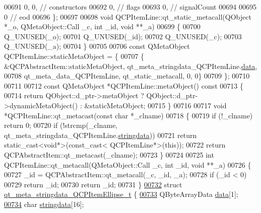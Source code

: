 \begin{DoxyCode}
00691        0,    0, \textcolor{comment}{// constructors}
00692        0,       \textcolor{comment}{// flags}
00693        0,       \textcolor{comment}{// signalCount}
00694 
00695        0        \textcolor{comment}{// eod}
00696 \};
00697 
00698 \textcolor{keywordtype}{void} QCPItemLine::qt\_static\_metacall(QObject *\_o, QMetaObject::Call \_c, \textcolor{keywordtype}{int} \_id, \textcolor{keywordtype}{void} **\_a)
00699 \{
00700     Q\_UNUSED(\_o);
00701     Q\_UNUSED(\_id);
00702     Q\_UNUSED(\_c);
00703     Q\_UNUSED(\_a);
00704 \}
00705 
00706 \textcolor{keyword}{const} QMetaObject QCPItemLine::staticMetaObject = \{
00707     \{ &QCPAbstractItem::staticMetaObject, qt\_meta\_stringdata\_QCPItemLine.\hyperlink{a00016_a02b269c84618a73b8cefdb4c4ae888c6}{data},
00708       qt\_meta\_data\_QCPItemLine,  qt\_static\_metacall, 0, 0\}
00709 \};
00710 
00711 
00712 \textcolor{keyword}{const} QMetaObject *QCPItemLine::metaObject()\textcolor{keyword}{ const}
00713 \textcolor{keyword}{}\{
00714     \textcolor{keywordflow}{return} QObject::d\_ptr->metaObject ? QObject::d\_ptr->dynamicMetaObject() : &staticMetaObject;
00715 \}
00716 
00717 \textcolor{keywordtype}{void} *QCPItemLine::qt\_metacast(\textcolor{keyword}{const} \textcolor{keywordtype}{char} *\_clname)
00718 \{
00719     \textcolor{keywordflow}{if} (!\_clname) \textcolor{keywordflow}{return} 0;
00720     \textcolor{keywordflow}{if} (!strcmp(\_clname, qt\_meta\_stringdata\_QCPItemLine.\hyperlink{a00016_ac705c65b9062c112f8ff0dd2a2915160}{stringdata}))
00721         \textcolor{keywordflow}{return} \textcolor{keyword}{static\_cast<}\textcolor{keywordtype}{void}*\textcolor{keyword}{>}(\textcolor{keyword}{const\_cast<} QCPItemLine*\textcolor{keyword}{>}(\textcolor{keyword}{this}));
00722     \textcolor{keywordflow}{return} QCPAbstractItem::qt\_metacast(\_clname);
00723 \}
00724 
00725 \textcolor{keywordtype}{int} QCPItemLine::qt\_metacall(QMetaObject::Call \_c, \textcolor{keywordtype}{int} \_id, \textcolor{keywordtype}{void} **\_a)
00726 \{
00727     \_id = QCPAbstractItem::qt\_metacall(\_c, \_id, \_a);
00728     \textcolor{keywordflow}{if} (\_id < 0)
00729         \textcolor{keywordflow}{return} \_id;
00730     \textcolor{keywordflow}{return} \_id;
00731 \}
\hypertarget{a00016_source_l00732}{}\hyperlink{a00016}{00732} \textcolor{keyword}{struct }\hyperlink{a00016_df/d98/a00107}{qt\_meta\_stringdata\_QCPItemEllipse\_t} \{
\hypertarget{a00016_source_l00733}{}\hyperlink{a00016_a7efd0687e2b0fbd2c4df25855b74af30}{00733}     QByteArrayData \hyperlink{a00016_a7efd0687e2b0fbd2c4df25855b74af30}{data}[1];
\hypertarget{a00016_source_l00734}{}\hyperlink{a00016_a35ee014e43cf9f75fa027534df3b222d}{00734}     \textcolor{keywordtype}{char} \hyperlink{a00016_a35ee014e43cf9f75fa027534df3b222d}{stringdata}[16];

\end{DoxyCode}
